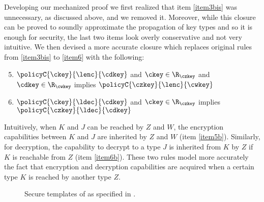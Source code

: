 Developing our mechanized proof we first realized that item \ref{item3bis} was unnecessary, as discussed above, and we removed it.
Moreover,
while this closure can be proved to soundly approximate the propagation of key types and so it is enough for security, the last two items look overly conservative and not very intuitive.
We then devised a more accurate closure which replaces original rules from \ref{item3bis} to \ref{item6} with the following:
\begin{enumerate}
    \setcounter{enumi}{4}
\item $\policyC{\ckey}{\lenc}{\cdkey}$ and $\ckey \in \R_\czkey$ and $\cdkey \in \R_\cwkey$ implies $\policyC{\czkey}{\lenc}{\cwkey}$
     \label{item5b}
\item \vspace*{-.2cm}$\policyC{\ckey}{\ldec}{\cdkey}$ and $\ckey \in \R_\czkey$ implies $\policyC{\czkey}{\ldec}{\cdkey}$
     \label{item6b}
\end{enumerate}
Intuitively, when $K$ and $J$ can be reached by $Z$ and $W$, the encryption capabilities between $K$ and $J$ are inherited by $Z$ and $W$ (item \ref{item5b}).
Similarly, for decryption, the capability to decrypt to a type $J$ is inherited from $K$ by $Z$ if $K$ is reachable from $Z$ (item \ref{item6b}).
These two rules model more accurately the fact that encryption and decryption capabilities are acquired when a certain type $K$ is reached by another type $Z$.
\begin{figure}[t]
    \centering
  \caption{Secure templates of \cite{BCFS-ccs10} as specified in \cite{focardi2021secure}.}
  \label{fig:templates}
\end{figure}

